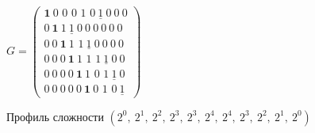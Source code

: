 \documentclass[fontsize=14pt]{article}
\begin{document}
\bigskip
\noindent
$G = 
\begin{pmatrix}
	\textbf{1}\ \textit{0\ 0\ 0\ 1\ 0}\ \underline{1}\ 0\ 0\ 0\\
	0\ \textbf{1}\ \textit{1}\ \underline{1}\ 0\ 0\ 0\ 0\ 0\ 0\\
	0\ 0\ \textbf{1}\ \textit{1\ 1}\ \underline{1}\ 0\ 0\ 0\ 0\\
	0\ 0\ 0\ \textbf{1}\ \textit{1\ 1\ 1}\ \underline{1}\ 0\ 0\\
	0\ 0\ 0\ 0\ \textbf{1}\ \textit{1\ 0\ 1}\ \underline{1}\ 0\\
	0\ 0\ 0\ 0\ 0\ \textbf{1}\ \textit{0\ 1\ 0}\ \underline{1}	
\end{pmatrix}$

\bigskip
\noindent
Профиль сложности $(2^0,\ 2^1,\ 2^2,\ 2^3,\ 2^3,\ 2^4,\ 2^4,\ 2^3,\ 2^2,\ 2^1,\ 2^0)$
\end{document}
